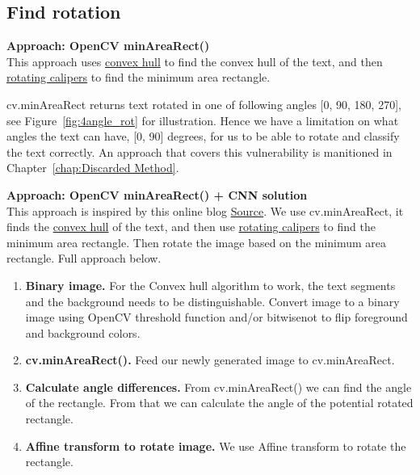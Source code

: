 \documentclass[Report.tex]{subfiles}
\begin{document}
\subsection{Find rotation}
\label{subsec:Find rotation}
\textbf{Approach: OpenCV minAreaRect()} \\
This approach uses \href{https://en.wikipedia.org/wiki/Convex_hull}{convex hull}
to find the convex hull of the text, and then
\href{https://en.wikipedia.org/wiki/Rotating_calipers}{rotating calipers} to
find the minimum area rectangle. \par
cv.minAreaRect returns text rotated in one of following angles [0\textdegree, 90\textdegree, 180\textdegree, 270\textdegree], see Figure~\ref{fig:4angle_rot} for illustration.
Hence we have a limitation on what angles the text can have, [0, 90] degrees, for us to be able to rotate and classify the text correctly. An approach that covers this vulnerability is manitioned in Chapter~\ref{chap:Discarded Method}.





\begin{flushleft}
  \textbf{Approach: OpenCV minAreaRect() + CNN solution} \\
  This approach is inspired by this online blog \href{https://www.pyimagesearch.com/2017/02/20/text-skew-correction-opencv-python/}{Source}\cite{rosebrock_text_2017}.
  We use cv.minAreaRect, it finds the \href{https://en.wikipedia.org/wiki/Convex_hull}{convex hull} of the text, and then use
  \href{https://en.wikipedia.org/wiki/Rotating_calipers}{rotating calipers} to
  find the minimum area rectangle. Then rotate the image based on the minimum area rectangle. Full approach below.
  \begin{enumerate}
    \item \textbf{Binary image.}
    For the Convex hull algorithm to work, the text segments and the background needs to be distinguishable. Convert image to a binary image using OpenCV threshold function and/or bitwise\textunderscore not to flip foreground and background colors.
    \item \textbf{cv.minAreaRect().}
    Feed our newly generated image to cv.minAreaRect.
    \item \textbf{Calculate angle differences.}
    From cv.minAreaRect() we can find the angle of the rectangle. From that we can calculate the angle of the potential rotated rectangle.
    \item \textbf{Affine transform to rotate image.}
    We use Affine transform to rotate the rectangle.
    \end{enumerate}
\end{flushleft}
\end{document}
